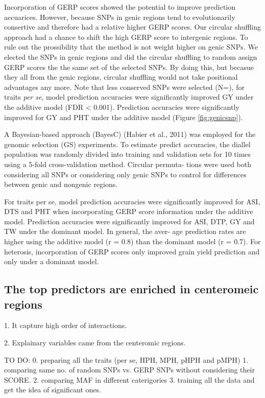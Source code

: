 \documentclass[9pt,twocolumn,twoside]{gsajnl}
\begin{document}
Incorporation of GERP scores showed the potential to improve prediction accuarices. However, because SNPs in genic regions tend to evolutionarily consertive and therefore had a relative higher GERP scores. Our circular shuffling approach had a chance to shift the high GERP score to intergenic regions. To rule out the prossibility that the method is not weight higher on genic SNPs. We elected the SNPs in genic regions and did the circular shuffling to random assign GERP scores the the same set of the selected SNPs. By doing this,  but becasue they all from the genic regions, circular shuffling would not take positional advantages any more. Note that less conserved SNPs were selected (N=), for traits \emph{per se}, model prediction accuracies were significantly improved GY under the additive model (FDR < 0.001). Prediction accuracies were significantly improved for GY and PHT under the additive model (Figure \ref{fig:genicsnp}).   

A Bayesian-based approach (BayesC) (Habier et al., 2011) was employed for the genomic selection (GS) experiments. To estimate predict accuracies, the diallel population was randomly divided into training and validation sets for 10 times using a 5-fold cross-validation method. Circular permuta- tions were used both considering all SNPs or considering only genic SNPs to control for differences between genic and nongenic regions.

For traits per se, model prediction accuracies were significantly improved for ASI, DTS and PHT when incorporating GERP score information under the additive model. Prediction accuracies were significantly improved for ASI, DTP, GY and TW under the dominant model. In general, the aver- age prediction rates are higher using the additive model (r = 0.8) than the dominant model (r = 0.7). For heterosis, incorporation of GERP scores only improved grain yield prediction and only under a dominant model.



\subsection*{The top predictors are enriched in centeromeic regions}

1. It capture high order of interactions.  

2. Explainary variables came from the centeromic regions.

TO DO:
0. preparing all the traits (per se, HPH, MPH, pHPH and pMPH)
1. comparing same no. of random SNPs vs. GERP SNPs without considering their SCORE.
2. comparing MAF in different caterigories
3. training all the data and get the idea of significant ones.
\end{document}
